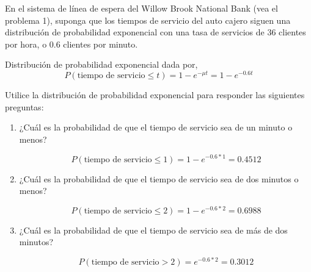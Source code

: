 \begin{problema}
	En el sistema de línea de espera del Willow Brook National Bank (vea el problema 1), suponga que los tiempos de servicio del auto cajero siguen una distribución de probabilidad exponencial con una tasa de servicios de 36 clientes por hora, o 0.6 clientes por minuto.
\begin{cajita}
	Distribución de probabilidad exponencial dada por, 
	$$P(\text{tiempo de servicio}\leq t)=1- e^{-\mu t}=1- e^{-0.6 t}$$
\end{cajita}
	 Utilice la distribución de probabilidad exponencial para responder las siguientes preguntas:
	 
	\begin{enumerate}
		\item ¿Cuál es la probabilidad de que el tiempo de servicio sea de un minuto o menos?
		\begin{sol}
			$$P(\text{tiempo de servicio}\leq 1)=1- e^{-0.6* 1}= 0.4512$$
		\end{sol}
		\item ¿Cuál es la probabilidad de que el tiempo de servicio sea de dos minutos o menos?
		\begin{sol}
			$$P(\text{tiempo de servicio}\leq 2)=1- e^{-0.6*  2}=0.6988$$
		\end{sol}
		\item ¿Cuál es la probabilidad de que el tiempo de servicio sea de más de dos minutos?
		\begin{sol}
			$$P(\text{tiempo de servicio}>2)=e^{-0.6* 2}=0.3012$$
		\end{sol}
	\end{enumerate}
\end{problema}


